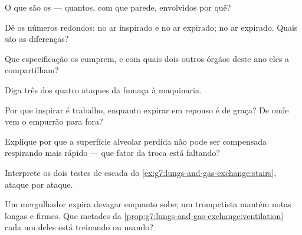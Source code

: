 \begin{exercise}[$\star$]\label{exo:g7:lungs-and-gas-exchange:3}
O que são os  --- quantos, com que parede, envolvidos por quê?
\end{exercise}

\begin{exercise}[$\star$]\label{exo:g7:lungs-and-gas-exchange:4}
Dê os números redondos:  no ar inspirado e no ar expirado;  no ar expirado. Quais são as diferenças?
\end{exercise}

\begin{exercise}[$\star$]\label{exo:g7:lungs-and-gas-exchange:5}
Que especificação os  cumprem, e com quais dois outros órgãos
deste ano eles a compartilham?
\end{exercise}

\begin{exercise}[$\star$]\label{exo:g7:lungs-and-gas-exchange:6}
Diga três dos quatro ataques da fumaça à maquinaria.
\end{exercise}

\begin{exercise}[$\star\star$]\label{exo:g7:lungs-and-gas-exchange:7}
Por que inspirar é trabalho, enquanto expirar em repouso é de graça?
De onde vem o empurrão para fora?
\end{exercise}

\begin{exercise}[$\star\star$]\label{exo:g7:lungs-and-gas-exchange:8}
Explique por que a superfície alveolar perdida não pode ser compensada
respirando mais rápido --- que fator da troca está faltando?
\end{exercise}

\begin{exercise}[$\star\star$]\label{exo:g7:lungs-and-gas-exchange:9}
Interprete os dois testes de escada do
\cref{ex:g7:lungs-and-gas-exchange:stairs}, ataque por ataque.
\end{exercise}

\begin{exercise}[$\star\star$]\label{exo:g7:lungs-and-gas-exchange:10}
Um mergulhador expira devagar enquanto sobe; um trompetista mantém
notas longas e firmes. Que metades da
\cref{prop:g7:lungs-and-gas-exchange:ventilation} cada um deles está
treinando ou usando?
\end{exercise}

